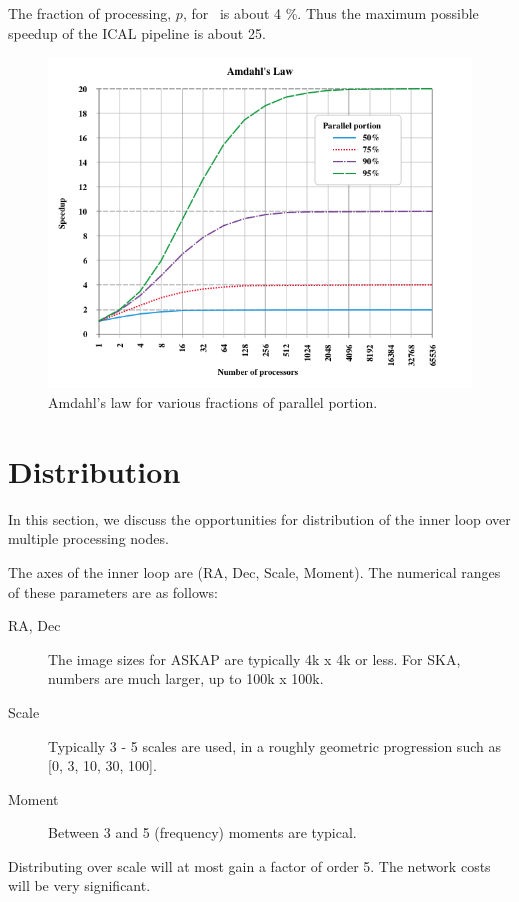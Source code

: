 \documentclass[11pt,a4paper,variablewidth]{article}
\begin{document}
The fraction of processing, $p$, for \MAM\ is about 4 \%. Thus the maximum possible speedup of the ICAL pipeline is about 25.
\begin{figure}[htb]
  \centering
  \includegraphics[width=\textwidth]{./AmdahlsLaw.png}
  \caption{Amdahl's law for various fractions of parallel portion.}
  \label{fig:amdahl}
\end{figure}

\clearpage

\pagebreak
\section{Distribution}
\label{sec:distribution}

In this section, we discuss the opportunities for distribution of the inner loop over multiple processing nodes.

The axes of the inner loop are (RA, Dec, Scale, Moment). The numerical ranges of these parameters are as follows:
\begin{description}
\item[RA, Dec] The image sizes for ASKAP are typically 4k x 4k or less. For SKA, numbers are much larger, up to 100k x 100k.
\item[Scale] Typically 3 - 5 scales are used, in a roughly geometric progression such as [0, 3, 10, 30, 100].
\item[Moment] Between 3 and 5 (frequency) moments are typical.
\end{description}

Distributing over scale will at most gain a factor of order 5. The network costs will be very significant. 
\end{document}
